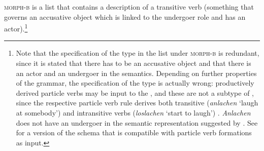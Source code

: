 \documentclass[output=paper
	        ,collection
	        ,collectionchapter
 	        ,biblatex
                ,babelshorthands
                ,newtxmath
                ,draftmode
                ,colorlinks, citecolor=brown
]{langscibook}
\begin{document}
\z
\textsc{morph-b} is a list that contains a description of a transitive verb (something that governs
an accusative object which is linked to the undergoer role  and has an actor).\footnote{
  Note that the specification of the type  in the list under \textsc{morph-b} is
  redundant, since it is stated that there has to be an accusative object and that there is an actor
  and an undergoer in the semantics. Depending on further properties of the grammar, the
  specification of the type is actually wrong: productively derived particle verbs may be input to
  the \bard, and these are not a subtype of , since the respective particle verb rule
  derives both transitive (\emph{anlachen} `laugh at somebody')  and intransitive verbs
  (\emph{loslachen} `start to laugh') \citep[]{Mueller2003a}. \emph{Anlachen} does not have an
  undergoer in the semantic representation suggested by \citet{Stiebels96a}. See
  \citet[]{Mueller2003a} for a version of the \bard schema that is compatible with particle verb
  formations as input.
}
\end{document}
